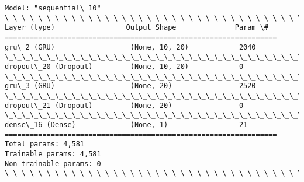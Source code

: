 \documentclass[11pt]{article}
\begin{document}
    \begin{Verbatim}[commandchars=\\\{\}]
Model: "sequential\_10"
\_\_\_\_\_\_\_\_\_\_\_\_\_\_\_\_\_\_\_\_\_\_\_\_\_\_\_\_\_\_\_\_\_\_\_\_\_\_\_\_\_\_\_\_\_\_\_\_\_\_\_\_\_\_\_\_\_\_\_\_\_\_\_\_\_
Layer (type)                 Output Shape              Param \#
=================================================================
gru\_2 (GRU)                  (None, 10, 20)            2040
\_\_\_\_\_\_\_\_\_\_\_\_\_\_\_\_\_\_\_\_\_\_\_\_\_\_\_\_\_\_\_\_\_\_\_\_\_\_\_\_\_\_\_\_\_\_\_\_\_\_\_\_\_\_\_\_\_\_\_\_\_\_\_\_\_
dropout\_20 (Dropout)         (None, 10, 20)            0
\_\_\_\_\_\_\_\_\_\_\_\_\_\_\_\_\_\_\_\_\_\_\_\_\_\_\_\_\_\_\_\_\_\_\_\_\_\_\_\_\_\_\_\_\_\_\_\_\_\_\_\_\_\_\_\_\_\_\_\_\_\_\_\_\_
gru\_3 (GRU)                  (None, 20)                2520
\_\_\_\_\_\_\_\_\_\_\_\_\_\_\_\_\_\_\_\_\_\_\_\_\_\_\_\_\_\_\_\_\_\_\_\_\_\_\_\_\_\_\_\_\_\_\_\_\_\_\_\_\_\_\_\_\_\_\_\_\_\_\_\_\_
dropout\_21 (Dropout)         (None, 20)                0
\_\_\_\_\_\_\_\_\_\_\_\_\_\_\_\_\_\_\_\_\_\_\_\_\_\_\_\_\_\_\_\_\_\_\_\_\_\_\_\_\_\_\_\_\_\_\_\_\_\_\_\_\_\_\_\_\_\_\_\_\_\_\_\_\_
dense\_16 (Dense)             (None, 1)                 21
=================================================================
Total params: 4,581
Trainable params: 4,581
Non-trainable params: 0
\_\_\_\_\_\_\_\_\_\_\_\_\_\_\_\_\_\_\_\_\_\_\_\_\_\_\_\_\_\_\_\_\_\_\_\_\_\_\_\_\_\_\_\_\_\_\_\_\_\_\_\_\_\_\_\_\_\_\_\_\_\_\_\_\_
    \end{Verbatim}
\end{document}
